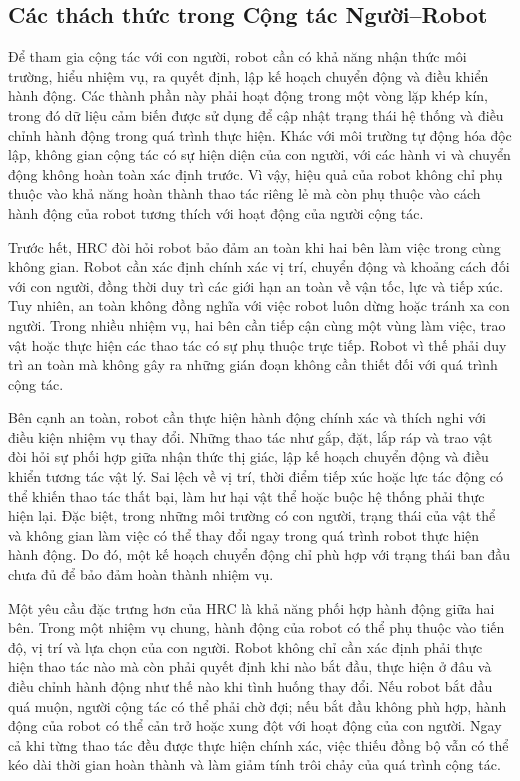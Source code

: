 \subsection{Các thách thức trong Cộng tác Người--Robot}

Để tham gia cộng tác với con người, robot cần có khả năng nhận thức môi trường, hiểu nhiệm vụ, ra quyết định, lập kế hoạch chuyển động và điều khiển hành động. Các thành phần này phải hoạt động trong một vòng lặp khép kín, trong đó dữ liệu cảm biến được sử dụng để cập nhật trạng thái hệ thống và điều chỉnh hành động trong quá trình thực hiện. Khác với môi trường tự động hóa độc lập, không gian cộng tác có sự hiện diện của con người, với các hành vi và chuyển động không hoàn toàn xác định trước. Vì vậy, hiệu quả của robot không chỉ phụ thuộc vào khả năng hoàn thành thao tác riêng lẻ mà còn phụ thuộc vào cách hành động của robot tương thích với hoạt động của người cộng tác.

Trước hết, HRC đòi hỏi robot bảo đảm an toàn khi hai bên làm việc trong cùng không gian. Robot cần xác định chính xác vị trí, chuyển động và khoảng cách đối với con người, đồng thời duy trì các giới hạn an toàn về vận tốc, lực và tiếp xúc. Tuy nhiên, an toàn không đồng nghĩa với việc robot luôn dừng hoặc tránh xa con người. Trong nhiều nhiệm vụ, hai bên cần tiếp cận cùng một vùng làm việc, trao vật hoặc thực hiện các thao tác có sự phụ thuộc trực tiếp. Robot vì thế phải duy trì an toàn mà không gây ra những gián đoạn không cần thiết đối với quá trình cộng tác.

Bên cạnh an toàn, robot cần thực hiện hành động chính xác và thích nghi với điều kiện nhiệm vụ thay đổi. Những thao tác như gắp, đặt, lắp ráp và trao vật đòi hỏi sự phối hợp giữa nhận thức thị giác, lập kế hoạch chuyển động và điều khiển tương tác vật lý. Sai lệch về vị trí, thời điểm tiếp xúc hoặc lực tác động có thể khiến thao tác thất bại, làm hư hại vật thể hoặc buộc hệ thống phải thực hiện lại. Đặc biệt, trong những môi trường có con người, trạng thái của vật thể và không gian làm việc có thể thay đổi ngay trong quá trình robot thực hiện hành động. Do đó, một kế hoạch chuyển động chỉ phù hợp với trạng thái ban đầu chưa đủ để bảo đảm hoàn thành nhiệm vụ.

Một yêu cầu đặc trưng hơn của HRC là khả năng phối hợp hành động giữa hai bên. Trong một nhiệm vụ chung, hành động của robot có thể phụ thuộc vào tiến độ, vị trí và lựa chọn của con người. Robot không chỉ cần xác định phải thực hiện thao tác nào mà còn phải quyết định khi nào bắt đầu, thực hiện ở đâu và điều chỉnh hành động như thế nào khi tình huống thay đổi. Nếu robot bắt đầu quá muộn, người cộng tác có thể phải chờ đợi; nếu bắt đầu không phù hợp, hành động của robot có thể cản trở hoặc xung đột với hoạt động của con người. Ngay cả khi từng thao tác đều được thực hiện chính xác, việc thiếu đồng bộ vẫn có thể kéo dài thời gian hoàn thành và làm giảm tính trôi chảy của quá trình cộng tác.

